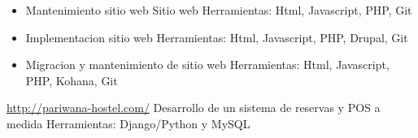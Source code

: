\documentclass[11pt,a4paper]{moderncv}
\begin{document}
{\begin{itemize}
            \newline{}
            Aplicacion móvil IPhone
            \newline{}
            Herramientas: iOS SDK, Facebook SDK, Twitter SDK, Jenkins, Git
            \newline{}
            https://itunes.apple.com/us/app/agiles-2013/id566003713?mt=8
            \newline{}
        \item Mantenimiento sitio web
            \newline{}
            Sitio web
            \newline{}
            Herramientas: Html, Javascript, PHP, Git
            \newline{}
        \item Implementacion sitio web
            \newline{}
            Herramientas: Html, Javascript, PHP, Drupal, Git
            \newline{}
        \item Migracion y mantenimiento de sitio web
            \newline{}
            Herramientas: Html, Javascript, PHP, Kohana, Git
            \newline{}
    \end{itemize}
}

{
    \url{http://pariwana-hostel.com/}
    \newline{}
    Desarrollo de un sistema de reservas y POS a medida
    \newline{}
    Herramientas: Django/Python y MySQL
}

\end{document}
